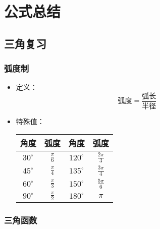 
\chapter{公式总结}

\section{三角复习}

\subsection{弧度制}

\begin{itemize}
    \item 定义：
    \begin{equation*}
        \textrm{弧度}=\frac{\textrm{弧长}}{\textrm{半径}}
    \end{equation*}
    \item 特殊值：
    \begin{center}
        \renewcommand\arraystretch{1.2}
        \begin{tabular}{c|c|c|c}
            \hline
            角度         & 弧度        & 角度         & 弧度 \\\hline
            $30^\circ$  & $\frac\pi6$ & $120^\circ$  & $\frac{2\pi}3$\\
            $45^\circ$  & $\frac\pi4$ & $135^\circ$  & $\frac{3\pi}4$\\
            $60^\circ$  & $\frac\pi3$ & $150^\circ$  & $\frac{5\pi}6$\\
            $90^\circ$  & $\frac\pi2$ & $180^\circ$  & $\pi$\\
            \hline
        \end{tabular}
    \end{center}
\end{itemize}

\subsection{三角函数}

